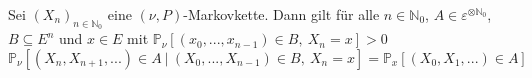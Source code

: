 \label{vorangegangene und zukünftige Ereignisse}
Sei $(X_{n})_{n \in \mathbb{N}_{0}}$  eine $(\nu,P)$-Markovkette. Dann gilt für alle $n \in \mathbb{N}_{0}$, $A \in \varepsilon^{ \otimes \mathbb{N}_{0}}$, $B \subseteq E^{n}$ und $x \in E$ mit $\mathbb{P}_{\nu}[(x_{0},...,x_{n-1}) \in B, \: X_{n} = x]>0$
\begin{equation*}
\mathbb{P}_{\nu}[(X_{n},X_{n+1},...) \in A \: | \: (X_{0},...,X_{n-1})  \in B, \: X_{n} = x] = \mathbb{P}_{x}[(X_{0},X_{1},...) \in A] 
\end{equation*}